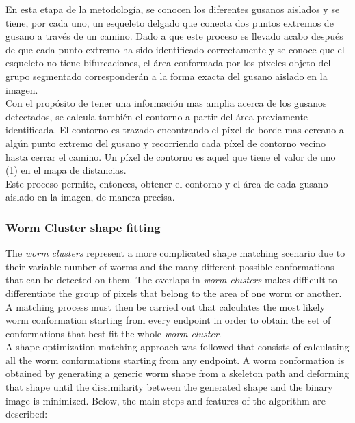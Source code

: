 En esta etapa de la metodolog\'ia, se conocen los diferentes gusanos aislados
y se tiene, por cada uno, un esqueleto delgado que conecta dos puntos
extremos de gusano a trav\'es de un camino.
Dado a que este proceso es llevado acabo despu\'es de que cada punto extremo
ha sido identificado correctamente y se conoce que el esqueleto no tiene
bifurcaciones, el \'area conformada por los p\'ixeles objeto del grupo
segmentado corresponder\'an a la forma exacta del gusano aislado en la
imagen.\\

Con el prop\'osito de tener una informaci\'on mas amplia acerca de los gusanos
detectados, se calcula tambi\'en el contorno a partir del \'area previamente identificada.
El contorno es trazado encontrando el p\'ixel de borde mas cercano a alg\'un punto extremo
del gusano y recorriendo cada p\'ixel de contorno vecino hasta cerrar el camino. 
Un p\'ixel de contorno es aquel que tiene el valor de uno (1) en el mapa de distancias.\\

Este proceso permite, entonces, obtener el contorno y el \'area de cada
gusano aislado en la imagen, de manera precisa.

\subsubsection{Worm Cluster shape fitting}
\label{sec:clusterfit}

The \emph{worm clusters} represent a more complicated shape matching scenario due to their
variable number of worms and the many different possible conformations that can be detected
on them. 
The  overlaps in \emph{worm clusters} makes difficult to differentiate the group of pixels
that belong to the area of one worm or another. A matching process must then be 
carried out that calculates the most likely worm conformation starting from every
endpoint in order to obtain the set of conformations that best fit the whole 
\emph{worm cluster}.\\

A shape optimization matching approach was followed that consists of calculating all the 
worm conformations starting from any endpoint. A worm conformation is obtained by generating
a generic worm shape from a skeleton path and deforming that shape until the dissimilarity
between the generated shape and the binary image is minimized. Below, the main steps and 
features of the algorithm are described:


